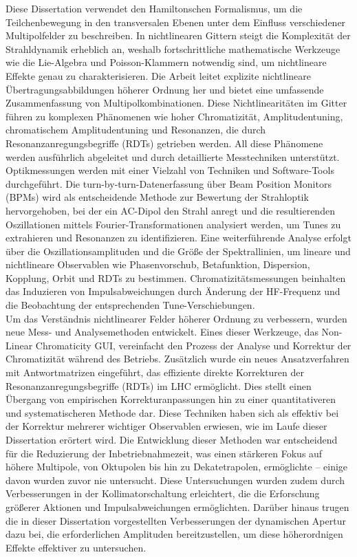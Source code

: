 {%
Diese Dissertation verwendet den Hamiltonschen Formalismus, um die Teilchenbewegung in den transversalen Ebenen unter dem Einfluss verschiedener Multipolfelder zu beschreiben. In nichtlinearen Gittern steigt die Komplexität der Strahldynamik erheblich an, weshalb fortschrittliche mathematische Werkzeuge wie die Lie-Algebra und Poisson-Klammern notwendig sind, um nichtlineare Effekte genau zu charakterisieren. Die Arbeit leitet explizite nichtlineare Übertragungsabbildungen höherer Ordnung her und bietet eine umfassende Zusammenfassung von Multipolkombinationen. Diese Nichtlinearitäten im Gitter führen zu komplexen Phänomenen wie hoher Chromatizität, Amplitudentuning, chromatischem Amplitudentuning und Resonanzen, die durch Resonanzanregungsbegriffe (RDTs) getrieben werden. All diese Phänomene werden ausführlich abgeleitet und durch detaillierte Messtechniken unterstützt.
\\
\indent
Optikmessungen werden mit einer Vielzahl von Techniken und Software-Tools durchgeführt. Die turn-by-turn-Datenerfassung über Beam Position Monitors (BPMs) wird als entscheidende Methode zur Bewertung der Strahloptik hervorgehoben, bei der ein AC-Dipol den Strahl anregt und die resultierenden Oszillationen mittels Fourier-Transformationen analysiert werden, um Tunes zu extrahieren und Resonanzen zu identifizieren. Eine weiterführende Analyse erfolgt über die Oszillationsamplituden und die Größe der Spektrallinien, um lineare und nichtlineare Observablen wie Phasenvorschub, Betafunktion, Dispersion, Kopplung, Orbit und RDTs zu bestimmen. Chromatizitätsmessungen beinhalten das Induzieren von Impulsabweichungen durch Änderung der HF-Frequenz und die Beobachtung der entsprechenden Tune-Verschiebungen.
\\
\indent
Um das Verständnis nichtlinearer Felder höherer Ordnung zu verbessern, wurden neue Mess- und Analysemethoden entwickelt. Eines dieser Werkzeuge, das Non-Linear Chromaticity GUI, vereinfacht den Prozess der Analyse und Korrektur der Chromatizität während des Betriebs. Zusätzlich wurde ein neues Ansatzverfahren mit Antwortmatrizen eingeführt, das effiziente direkte Korrekturen der Resonanzanregungsbegriffe (RDTs) im LHC ermöglicht. Dies stellt einen Übergang von empirischen Korrekturanpassungen hin zu einer quantitativeren und systematischeren Methode dar. Diese Techniken haben sich als effektiv bei der Korrektur mehrerer wichtiger Observablen erwiesen, wie im Laufe dieser Dissertation erörtert wird. Die Entwicklung dieser Methoden war entscheidend für die Reduzierung der Inbetriebnahmezeit, was einen stärkeren Fokus auf höhere Multipole, von Oktupolen bis hin zu Dekatetrapolen, ermöglichte – einige davon wurden zuvor nie untersucht. Diese Untersuchungen wurden zudem durch Verbesserungen in der Kollimatorschaltung erleichtert, die die Erforschung größerer Aktionen und Impulsabweichungen ermöglichten. Darüber hinaus trugen die in dieser Dissertation vorgestellten Verbesserungen der dynamischen Apertur dazu bei, die erforderlichen Amplituden bereitzustellen, um diese höherordnigen Effekte effektiver zu untersuchen.

}
